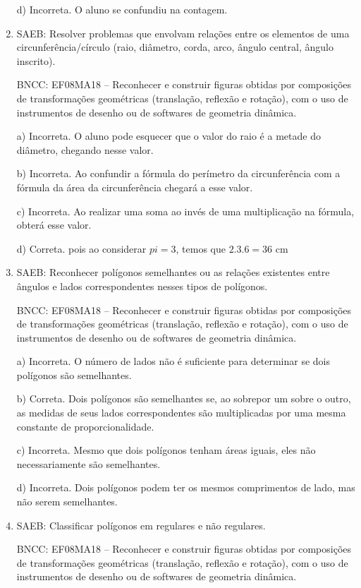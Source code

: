 \begin{enumerate}
d) Incorreta. O aluno se confundiu na contagem.

\item SAEB: Resolver problemas que envolvam relações entre os elementos de uma
circunferência/círculo (raio, diâmetro, corda, arco, ângulo central,
ângulo inscrito).

BNCC: EF08MA18 -- Reconhecer e construir figuras obtidas por composições
de transformações geométricas (translação, reflexão e rotação), com o
uso de instrumentos de desenho ou de softwares de geometria dinâmica.

a) Incorreta. O aluno pode esquecer que o valor do raio é a metade
do diâmetro, chegando nesse valor.

b) Incorreta. Ao confundir a fórmula do perímetro da circunferência
com a fórmula da área da circunferência chegará a esse valor.

c) Incorreta. Ao realizar uma soma ao invés de uma multiplicação
na fórmula, obterá esse valor.

d) Correta. pois ao considerar $pi = 3$, temos que $2.3.6 = 36$ cm

\item SAEB: Reconhecer polígonos semelhantes ou as relações existentes entre
ângulos e lados correspondentes nesses tipos de polígonos.

BNCC: EF08MA18 -- Reconhecer e construir figuras obtidas por composições
de transformações geométricas (translação, reflexão e rotação), com o
uso de instrumentos de desenho ou de softwares de geometria dinâmica.

a) Incorreta. O número de lados não é suficiente para determinar se
dois polígonos são semelhantes.

b) Correta. Dois polígonos são semelhantes se, ao sobrepor um sobre
o outro, as medidas de seus lados correspondentes são multiplicadas por
uma mesma constante de proporcionalidade.

c) Incorreta. Mesmo que dois polígonos tenham áreas iguais, eles
não necessariamente são semelhantes.

d) Incorreta. Dois polígonos podem ter os mesmos comprimentos de
lado, mas não serem semelhantes.

\item SAEB: Classificar polígonos em regulares e não regulares.

BNCC: EF08MA18 -- Reconhecer e construir figuras obtidas por composições
de transformações geométricas (translação, reflexão e rotação), com o
uso de instrumentos de desenho ou de softwares de geometria dinâmica.


\end{enumerate}
